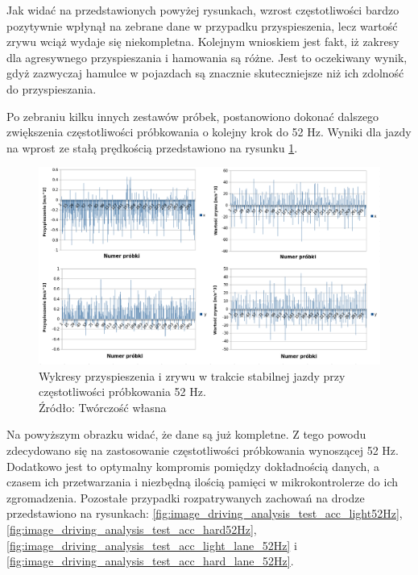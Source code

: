 \clearpage
Jak widać na przedstawionych powyżej rysunkach, wzrost częstotliwości bardzo pozytywnie wpłynął na zebrane dane w przypadku przyspieszenia, lecz wartość zrywu wciąż wydaje się niekompletna. Kolejnym wnioskiem jest fakt, iż zakresy dla agresywnego przyspieszania i hamowania są różne. Jest to oczekiwany wynik, gdyż zazwyczaj hamulce w pojazdach są znacznie skuteczniejsze niż ich zdolność do przyspieszania. 

Po zebraniu kilku innych zestawów próbek, postanowiono dokonać dalszego zwiększenia częstotliwości próbkowania o kolejny krok do 52 Hz. Wyniki dla jazdy na wprost ze stałą prędkością przedstawiono na rysunku \ref{fig:image_driving_analysis_test_52Hz}.

\begin{figure}[H]
	\centering
	\includegraphics[width=15cm]{img/driving_analysis/stabilna_52.png}
	\caption{Wykresy przyspieszenia i zrywu w trakcie stabilnej jazdy przy częstotliwości próbkowania 52 Hz.
	\\Źródło: Twórczość własna}
	\label{fig:image_driving_analysis_test_52Hz}
\end{figure}

Na powyższym obrazku widać, że dane są już kompletne. Z tego powodu zdecydowano się na zastosowanie częstotliwości próbkowania wynoszącej 52 Hz. Dodatkowo jest to optymalny kompromis pomiędzy dokładnością danych, a czasem ich przetwarzania i niezbędną ilością pamięci w mikrokontrolerze do ich zgromadzenia. Pozostałe przypadki rozpatrywanych zachowań na drodze przedstawiono na rysunkach: \ref{fig:image_driving_analysis_test_acc_light52Hz}, \ref{fig:image_driving_analysis_test_acc_hard52Hz}, \ref{fig:image_driving_analysis_test_acc_light_lane_52Hz} i \ref{fig:image_driving_analysis_test_acc_hard_lane_52Hz}.

